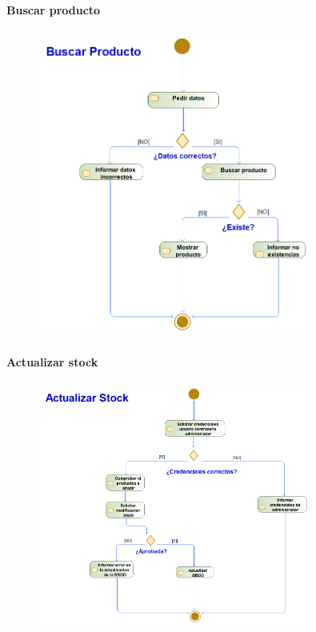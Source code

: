 \paragraph{Buscar producto}
\begin{figure}[H]
    \centering
    \includegraphics[width=0.8\textwidth]{Use_Cases/ProyectoIS_BuscarProducto.png}
\end{figure}
\paragraph{Actualizar stock}
\begin{figure}[H]
    \centering
    \includegraphics[width=0.8\textwidth]{Use_Cases/ProyectoIS_ActualizarStock.png}
\end{figure}
